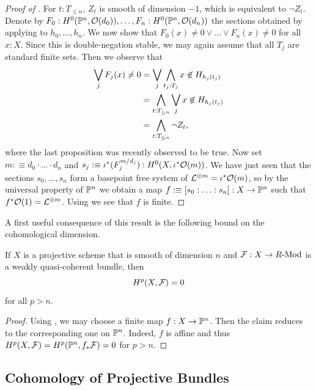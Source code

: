 \begin{proof}[Proof of ]
  For $t:T_{\leq n}$, $Z_t$ is smooth of dimension $-1$, which is equivalent to $\neg Z_t$.
  Denote by $F_0 : H^0(\mathbb{P}^n, \mathcal{O}(d_0)), \hdots, F_n : H^0(\mathbb{P}^n, \mathcal{O}(d_n))$ the sections obtained by applying  to $h_0, \hdots, h_n$.
  We now show that $F_0(x) \neq 0 \lor \hdots \lor F_n(x) \neq 0$ for all $x:X$.
  Since this is double-negation stable, we may again assume that all $T_j$ are standard finite sets.
  Then we observe that
  \begin{align*}
    \bigvee_j F_j(x) \neq 0 &= \bigvee_j \bigwedge_{t_j:T_j} x \not\in H_{h_j(t_j)} \\
                            &= \bigwedge_{t:T_{\leq n}} \bigvee_{j} x \not\in H_{h_j(t_j)} \\
                            &= \bigwedge_{t:T_{\leq n}} \neg Z_t \rlap{,}
  \end{align*}
  where the last proposition was recently observed to be true.
  Now set $m :\equiv d_0 \cdot \hdots \cdot d_n$ and $s_j :\equiv \iota^\ast(F_j^{m/d_j}) : H^0(X, \iota^\ast\mathcal{O}(m))$.
  We have just seen that the sections $s_0, \hdots, s_n$ form a basepoint free system of $\mathcal{L}^{\otimes m} = \iota^\ast \mathcal{O}(m)$, so by the universal property of $\mathbb{P}^n$ we obtain a map $f :\equiv [s_0 : \hdots : s_n] : X \to \mathbb{P}^n$ such that $f^\ast\mathcal{O}(1) = \mathcal{L}^{\otimes m}$.
  Using  we see that $f$ is finite.
\end{proof}


A first useful consequence of this result is the following bound on the cohomological dimension.

\begin{corollary}
  If $X$ is a projective scheme that is smooth of dimension $n$ and $\mathcal{F} : X \to R\text{-}\mathrm{Mod}$ is a weakly quasi-coherent bundle, then
  \[
    H^p(X,\mathcal{F}) = 0
  \]
  for all $p > n$.
\end{corollary}

\begin{proof}
  Using , we may choose a finite map $f : X \to \mathbb{P}^n$.
  Then the claim reduces to the corresponding one on $\mathbb{P}^n$.
  Indeed, $f$ is affine and thus $H^p(X,\mathcal{F}) = H^p(\mathbb{P}^n,f_\ast\mathcal{F}) = 0$ for $p > n$.
\end{proof}



\subsection{Cohomology of Projective Bundles}


